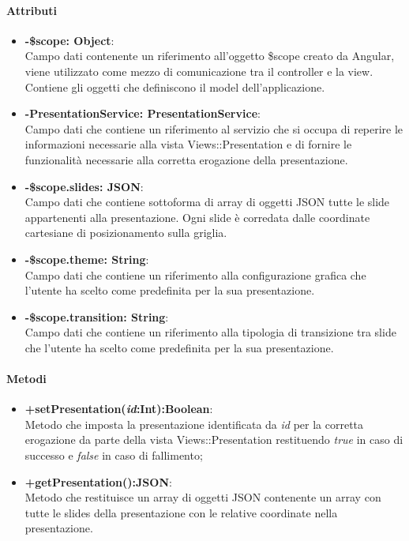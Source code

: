 	\paragraph{Attributi}
	\begin{itemize}
		\item \textbf{-\$scope: Object}:\\
			Campo dati contenente un riferimento all'oggetto \$scope creato da Angular, viene utilizzato come mezzo di comunicazione tra il controller e la view. Contiene gli oggetti che definiscono il model dell'applicazione.
		\item \textbf{-PresentationService: PresentationService}:\\
			Campo dati che contiene un riferimento al servizio che si occupa di reperire le informazioni necessarie alla vista Views::Presentation e di fornire le funzionalità necessarie alla corretta erogazione della presentazione.
		\item \textbf{-\$scope.slides: JSON}:\\
			Campo dati che contiene sottoforma di array di oggetti JSON tutte le slide appartenenti alla presentazione. Ogni slide è corredata dalle coordinate cartesiane di posizionamento sulla griglia.
		
		\item \textbf{-\$scope.theme: String}:\\
			Campo dati che contiene un riferimento alla configurazione grafica che l'utente ha scelto come predefinita per la sua presentazione.
		
		\item \textbf{-\$scope.transition: String}:\\
			Campo dati che contiene un riferimento alla tipologia di transizione tra slide che l'utente ha scelto come predefinita per la sua presentazione.
	\end{itemize}
	
	\paragraph{Metodi}
	\begin{itemize}
	  \item \textbf{+setPresentation(\textit{id}:Int):Boolean}:\\
		  Metodo che imposta la presentazione identificata da  \textit{id} per la corretta erogazione da parte della vista Views::Presentation restituendo \textit{true} in caso di successo e \textit{false} in caso di fallimento;
	  \item \textbf{+getPresentation():JSON}:\\
		  Metodo che restituisce un array di oggetti JSON contenente un array con tutte le slides della presentazione con le relative coordinate nella presentazione.
		  
	\end{itemize}
